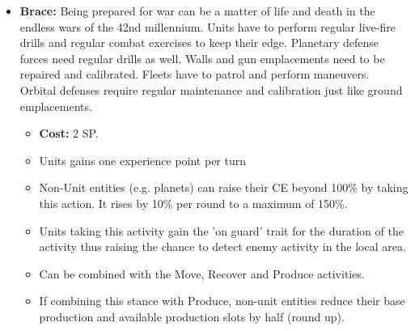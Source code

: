 \begin{itemize}
	\item \textbf{Brace:} Being prepared for war can be a matter of life and death in the endless wars of the 42nd millennium. Units have to perform regular live-fire drills and regular combat exercises to keep their edge. Planetary defense forces need regular drills as well. Walls and gun emplacements need to be repaired and calibrated. Fleets have to patrol and perform maneuvers. Orbital defenses require regular maintenance and calibration just like ground emplacements.
	\begin{itemize}
		\item \textbf{Cost:} 2 SP.
		\item Units gains one experience point per turn
		\item Non-Unit entities (e.g. planets) can raise their CE beyond 100\% by taking this action. It rises by 10\% per round to a maximum of 150\%.
		\item Units taking this activity gain the 'on guard' trait for the duration of the activity thus raising the chance to detect enemy activity in the local area.
		\item Can be combined with the Move, Recover and Produce activities. 
		\item If combining this stance with Produce, non-unit entities reduce their base production and available production slots by half (round up).
	\end{itemize}
	

\end{itemize}
